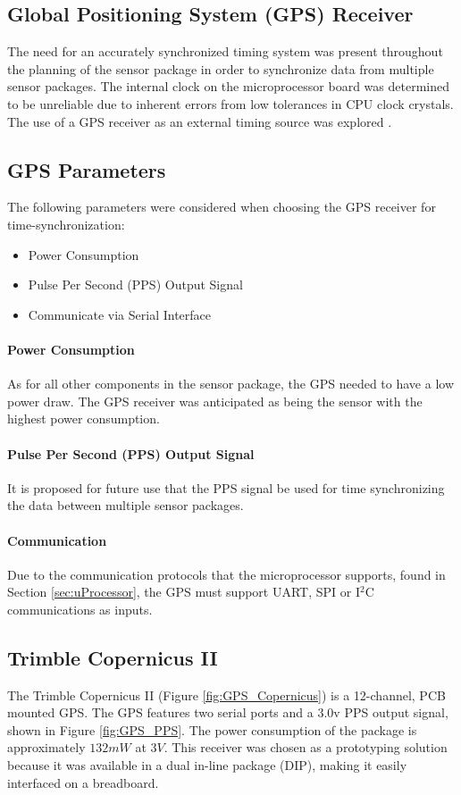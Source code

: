 \subsection{Global Positioning System (GPS) Receiver}
\indent The need for an accurately synchronized timing system was present throughout the planning of the sensor package in order to synchronize data from
multiple sensor packages. The internal clock on the microprocessor board was determined to be unreliable due to inherent errors from low tolerances in CPU
clock crystals. The use of a GPS receiver as an external timing source was explored \cite{GPSTimeSync}.
\subsection{GPS Parameters}
\label{sec:GPS_Parameters}
\indent The following parameters were considered when choosing the GPS receiver for time-synchronization:
\begin{itemize}
\item Power Consumption 
\item Pulse Per Second (PPS) Output Signal
\item Communicate via Serial Interface
\end{itemize}
\paragraph{Power Consumption}
\label{sec:GPS_power_cons.}
\indent As for all other components in the sensor package, the GPS needed to have a low power draw. The GPS receiver was anticipated as being the sensor
with the highest power consumption.
%
\paragraph{Pulse Per Second (PPS) Output Signal}
\label{sec:gps_out_ch_num}
\indent It is proposed for future use that the PPS signal be used for time synchronizing the data between multiple sensor packages.

\paragraph{Communication}
\label{sec:adc_comm}
\indent Due to the communication protocols that the microprocessor supports, found in Section \ref{sec:uProcessor}, the GPS must support UART, SPI or
I$^{2}$C communications as inputs.

\subsection{Trimble Copernicus II}
\label{sec:GPS_Trimble}
\indent The Trimble Copernicus II (Figure \ref{fig:GPS_Copernicus}) is a 12-channel, PCB mounted GPS. The GPS features two serial ports and a 3.0v PPS
output signal, shown in Figure \ref{fig:GPS_PPS}. The power consumption of the package is approximately $132mW$ at $3V$. This receiver was chosen as a
prototyping solution because it was available in a dual in-line package (DIP), making it easily interfaced on a breadboard. 

